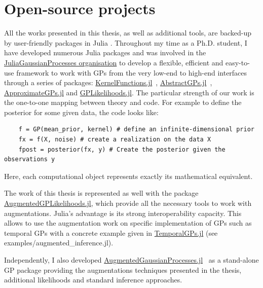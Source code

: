 \section{Open-source projects}

All the works presented in this thesis, as well as additional tools, are backed-up by user-friendly packages in Julia \cite{Julia-2017}.
Throughout my time as a Ph.D. student, I have developed numerous Julia packages and was involved in the \href{https://github.com/JuliaGaussianProcesses}{JuliaGaussianProcesses organisation} to develop a flexible, efficient and easy-to-use framework to work with \ac{GPs} from the very low-end to high-end interfaces through a series of packages: \href{https://github.com/JuliaGaussianProcesses/KernelFunctions.jl}{KernelFunctions.jl}~\cite{theo_galy_fajou_2022_6246597}, \href{https://github.com/JuliaGaussianProcesses/AbstractGPs.jl}{AbstractGPs.jl}~\cite{david_widmann_2022_5939997}, \href{https://github.com/JuliaGaussianProcesses/ApproximateGPs.jl}{ApproximateGPs.jl} and \href{https://github.com/JuliaGaussianProcesses/GPLikelihoods.jl}{GPLikelihoods.jl}.
The particular strength of our work is the one-to-one mapping between theory and code.
For example to define the posterior for some given data, the code looks like:
\begin{verbatim}
    f = GP(mean_prior, kernel) # define an infinite-dimensional prior
    fx = f(X, noise) # create a realization on the data X
    fpost = posterior(fx, y) # Create the posterior given the observations y
\end{verbatim}
Here, each computational object represents exactly its mathematical equivalent.

The work of this thesis is represented as well with the package \href{https://github.com/JuliaGaussianProcesses/AugmentedGPLikelihoods.jl}{AugmentedGPLikelihoods.jl}, which provide all the necessary tools to work with augmentations.
Julia's advantage is its strong interoperability capacity.
This allows to use the augmentation work on specific implementation of \ac{GPs} such as temporal \ac{GPs} with a concrete example given in \href{https://github.com/JuliaGaussianProcesses/TemporalGPs.jl}{TemporalGPs.jl} (see examples/augmented\_inference.jl).

Independently, I also developed \href{https://github.com/theogf/AugmentedGaussianProcesses.jl}{AugmentedGaussianProcesses.jl}~\cite{theo_galy_fajou_2021_5728215} as a stand-alone \ac{GP} package providing the augmentations techniques presented in the thesis, additional likelihoods and standard inference approaches.


